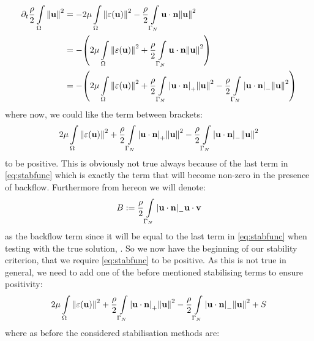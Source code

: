 \[
\begin{aligned}
   \partial_t\frac{\rho}{2}\int\limits_{\Omega}\norm{{\textbf{u}}}^2 &= -2\mu\int\limits_{\Omega}\norm{\varepsilon({\textbf{u}})}^2 - \frac{\rho}{2}\int\limits_{\Gamma_{N}}{\textbf{u}}\cdot{\textbf{n}}\norm{{\textbf{u}}}^2\\
                                              &= -\qty(2\mu\int\limits_{\Omega}\norm{\varepsilon({\textbf{u}})}^2 + \frac{\rho}{2}\int\limits_{\Gamma_{N}}{\textbf{u}}\cdot{\textbf{n}}\norm{{\textbf{u}}}^2)\\
                                              &= -\qty(2\mu\int\limits_{\Omega}\norm{\varepsilon({\textbf{u}})}^2 + \frac{\rho}{2}\int\limits_{\Gamma_{N}}\abs{{\textbf{u}}\cdot{\textbf{n}}}_+\norm{{\textbf{u}}}^2 - \frac{\rho}{2}\int\limits_{\Gamma_{N}}\abs{{\textbf{u}}\cdot{\textbf{n}}}_-\norm{{\textbf{u}}}^2)
\end{aligned}
\]
where now, we could like the term between brackets:
\begin{equation}\label{eq:stabfunc}
    2\mu\int\limits_{\Omega}\norm{\varepsilon({\textbf{u}})}^2 + \frac{\rho}{2}\int\limits_{\Gamma_{N}}\abs{{\textbf{u}}\cdot{\textbf{n}}}_+\norm{{\textbf{u}}}^2 - \frac{\rho}{2}\int\limits_{\Gamma_{N}}\abs{{\textbf{u}}\cdot{\textbf{n}}}_-\norm{{\textbf{u}}}^2
\end{equation}
to be positive. This is obviously not true always because of the last term in \autoref{eq:stabfunc} which is exactly the term that will become non-zero in the presence of backflow. Furthermore from hereon we will denote:
\begin{equation}\label{eq:backflow}
    B := \frac{\rho}{2}\int\limits_{\Gamma_{N}}\abs{{\textbf{u}}\cdot{\textbf{n}}}_- {\textbf{u}} \cdot {\textbf{v}}
\end{equation} as the backflow term since it will be equal to the last term in \autoref{eq:stabfunc} when testing with the true solution, \mathm{\bmu}. So we now have the beginning of our stability criterion, that we require  \autoref{eq:stabfunc} to be positive. As this is not true in general, we need to add one of the before mentioned stabilising terms to ensure positivity: 
\begin{equation}\label{eq:stabfunc2}
    2\mu\int\limits_{\Omega}\norm{\varepsilon({\textbf{u}})}^2 + \frac{\rho}{2}\int\limits_{\Gamma_{N}}\abs{{\textbf{u}}\cdot{\textbf{n}}}_+\norm{{\textbf{u}}}^2 - \frac{\rho}{2}\int\limits_{\Gamma_{N}}\abs{{\textbf{u}}\cdot{\textbf{n}}}_-\norm{{\textbf{u}}}^2 + S
\end{equation}
where as before the considered stabilisation methods are:
